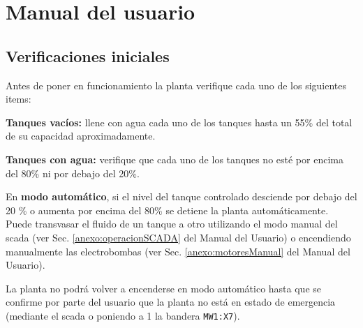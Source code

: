 \chapter{Manual del usuario}
\label{anexo:manualUsuario}

\section{Verificaciones iniciales}
\label{anexo:verificaciones}
Antes de poner en funcionamiento la planta verifique cada uno de los siguientes
items:

\begin{tcolorbox}[title=Nivel de agua]
\textbf{Tanques vacíos:} llene con agua cada uno de los tanques hasta un 55\%
del total de su capacidad aproximadamente.

\textbf{Tanques con agua:} verifique que cada uno de los tanques no esté por
encima del 80\% ni por debajo del 20\%.

\end {tcolorbox}
\begin{lattention}
En \textbf{modo automático}, si el nivel del tanque controlado desciende por
debajo del 20 \% o aumenta por encima del 80\% se detiene la planta 
automáticamente. Puede transvasar el fluido de un tanque a otro utilizando el
modo manual del \gls{scada} (ver Sec. \ref{anexo:operacionSCADA} del Manual
del Usuario) o encendiendo
manualmente las electrobombas (ver Sec. \ref{anexo:motoresManual} del Manual del
Usuario).

La planta no podrá volver a encenderse en modo automático hasta que se confirme
por parte del usuario que la planta no está en estado de emergencia (mediante el
\gls{scada} o poniendo a 1 la bandera \verb|MW1:X7|).
\end{lattention}

